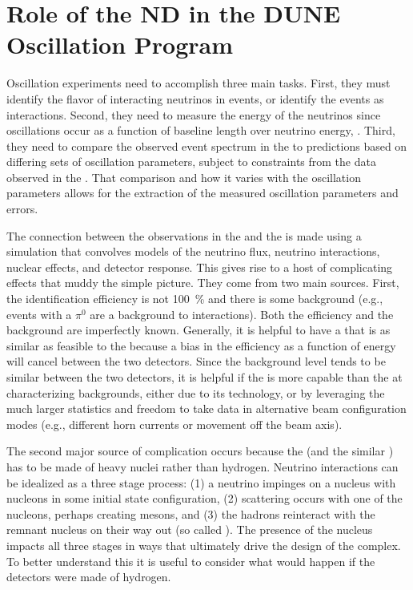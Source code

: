 \section{Role of the ND in the DUNE Oscillation Program}
\label{sec:appx-nd:exsum-nd-role}

Oscillation experiments need to accomplish three main tasks. First, they must identify the flavor of interacting neutrinos in  events, or identify the events as  interactions. Second, they need to measure the energy of the neutrinos since oscillations occur as a function of baseline length over neutrino energy, . Third, they need to compare the observed event spectrum in the  to  predictions based on differing sets of oscillation parameters, subject to constraints from the data observed in the .  That comparison and how it varies with the oscillation parameters allows for the extraction of the  measured oscillation parameters and errors.

The connection between the observations in the  and the  is made using a simulation that convolves models of the neutrino flux, neutrino interactions, nuclear effects, and detector response.
This gives rise to a host of complicating effects that 
muddy the simple picture. They come from two main sources. First, the identification efficiency is not \SI{100}{\%} and there is 
some background (e.g.,  events with a $\pi^0$ are a background to \nue {} interactions). Both the efficiency and the background are imperfectly known. Generally, it is helpful to have a   that is as similar as feasible to the   because a bias in the efficiency as a function of energy will cancel between the two detectors. Since the background level tends to be similar between the two detectors, it is helpful if the  is more capable than the  at characterizing backgrounds, either due to its technology, or by leveraging the much larger statistics and freedom to take data in alternative beam configuration modes (e.g., different horn currents or movement off the beam axis). 

The second major source of complication occurs because the  (and the similar ) has to be made of heavy nuclei rather than hydrogen. Neutrino interactions can be idealized as a three stage process: (1) a neutrino impinges on a nucleus with nucleons in some initial state configuration, (2) scattering occurs with one of the nucleons, perhaps creating mesons, and (3) the hadrons reinteract with the remnant nucleus on their way out (so called ). The presence of the nucleus impacts all three stages in ways that ultimately drive the design of the   complex. To better understand this it is useful to consider what would happen if the detectors were made of hydrogen.

